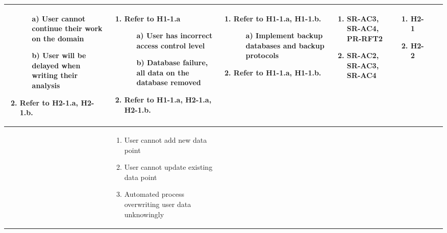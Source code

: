 \documentclass{article}
\begin{document}
\begin{landscape}
\begin{longtable}{|p{2cm}|p{4cm}|p{4cm}|p{4cm}|p{4cm}|p{2cm}|p{2cm}|}
\begin{enumerate}[leftmargin=*]
    \begin{enumerate}
        \item[a)] User cannot continue their work on the domain
        \item[b)] User will be delayed when writing their analysis
    \end{enumerate}
    \item Refer to H2-1.a, H2-1.b.
  \end{enumerate} &
  \begin{enumerate}[leftmargin=*]
    \item  Refer to H1-1.a
    \begin{enumerate}
        \item[a)] User has incorrect access control level
        \item[b)] Database failure, all data on the database removed
    \end{enumerate}
    \item Refer to H1-1.a, H2-1.a, H2-1.b.
  \end{enumerate} &
  \begin{enumerate}[leftmargin=*]
       \item Refer to H1-1.a, H1-1.b.
       \begin{enumerate}
        \item[a)] Implement backup databases and backup protocols
    \end{enumerate}
       \item  Refer to H1-1.a, H1-1.b.
  \end{enumerate} &
  \begin{enumerate}[leftmargin=*]
       \item SR-AC3, SR-AC4, PR-RFT2
       \item SR-AC2, SR-AC3, SR-AC4
  \end{enumerate} &
  \begin{enumerate}[leftmargin=*]
       \item H2-1
       \item H2-2
  \end{enumerate} \\
  \hline
   &
  \begin{enumerate}[leftmargin=*]
      \item User cannot add new data point
      \item User cannot update existing data point
      \item Automated process overwriting user data unknowingly

\end{enumerate}
\end{longtable}
\end{landscape}
\end{document}
